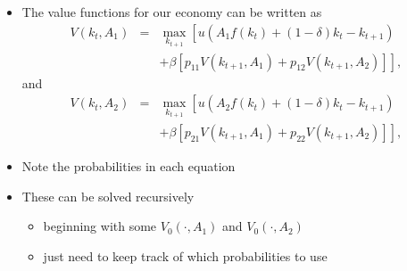 \documentclass[notes=show]{beamer}
\begin{document}
\begin{frame}%


\begin{itemize}
\item The value functions for our economy can be written as%
\begin{eqnarray*}
V(k_{t},A_{1}) &=&\max_{k_{t+1}}\left[ u(A_{1}f(k_{t})+(1-\delta
)k_{t}-k_{t+1})\right. \\
&&\left. +\beta \left[ p_{11}V\left( k_{t+1},A_{1}\right) +p_{12}V\left(
k_{t+1},A_{2}\right) \right] \right] ,
\end{eqnarray*}%
and%
\begin{eqnarray*}
V(k_{t},A_{2}) &=&\max_{k_{t+1}}\left[ u(A_{2}f(k_{t})+(1-\delta
)k_{t}-k_{t+1})\right. \\
&&\left. +\beta \left[ p_{21}V\left( k_{t+1},A_{1}\right) +p_{22}V\left(
k_{t+1},A_{2}\right) \right] \right] ,
\end{eqnarray*}

\item Note the probabilities in each equation

\item These can be solved recursively

\begin{itemize}
\item beginning with some $V_{0}(\cdot ,A_{1})$ and $V_{0}(\cdot ,A_{2})$

\item just need to keep track of which probabilities to use
\end{itemize}
\end{itemize}

\end{frame}%
\end{document}
